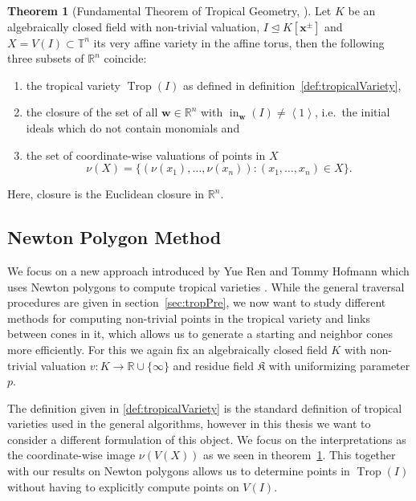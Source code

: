 \documentclass[
  paper=a4,
  titlepage,
  bibliography=totoc,
  listof=totoc,
  pagesize=pdftex
]{scrartcl}
\numberwithin{figure}{section}
\numberwithin{equation}{section}
\numberwithin{table}{section}
\newcommand*\setR{\mathds{R}}
\newcommand*\setT{\mathds{T}}
\newcommand*\ideal[1]{\left\langle #1 \right\rangle}
\let\vec\mathbf
\let\idealof\trianglelefteq
\DeclareMathOperator{\Trop}{Trop}
\DeclareMathOperator{\initial}{in}
\theoremstyle{definition}
\newtheorem{theorem}[definition]{Theorem}
\numberwithin{definition}{section}
\begin{document}
\begin{theorem}[Fundamental Theorem of Tropical Geometry,
  {\cite[Theorem~3.2.5]{sturmMacTrop}}]
  Let $K$ be an algebraically closed field with non-trivial valuation, $I \idealof K[\vec
  x^\pm]$ and $X = V(I) \subset \setT^n$ its very affine variety in the affine torus, then
  the following three subsets of $\setR^n$ coincide:
  \begin{enumerate}
    \item the tropical variety $\Trop(I)$ as defined in
      definition~\ref{def:tropicalVariety},
    \item the closure of the set of all $\vec w \in \setR^n$ with $\initial_{\vec w}(I)
      \neq \ideal1$, i.e.\ the initial ideals which do not contain monomials and
    \item the set of coordinate-wise valuations of points in $X$
      \[
        \nu(X) = \{ (\nu(x_1), \dots, \nu(x_n)) : (x_1, \dots, x_n) \in X \}.
      \]
  \end{enumerate}
  Here, closure is the Euclidean closure in $\setR^n$.
  \label{thm:fundamentalThm}
\end{theorem}


\subsection{Newton Polygon Method}

We focus on a new approach introduced by Yue Ren and Tommy Hofmann which uses Newton
polygons to compute tropical varieties \cite{tropPointsLinks}. While the general traversal
procedures are given in section~\ref{sec:tropPre}, we now want to study different methods
for computing non-trivial points in the tropical variety and links between cones in it,
which allows us to generate a starting and neighbor cones more efficiently. For this we
again fix an algebraically closed field $K$ with non-trivial valuation $v:K\to\setR \cup
\{\infty\}$ and residue field $\mathfrak K$ with uniformizing parameter $p$.

The definition given in \ref{def:tropicalVariety} is the standard definition of tropical
varieties used in the general algorithms, however in this thesis we want to consider a
different formulation of this object. We focus on the interpretations as the
coordinate-wise image $\nu(V(X))$ as we seen in theorem~\ref{thm:fundamentalThm}. This
together with our results on Newton polygons allows us to determine points in $\Trop(I)$
without having to explicitly compute points on $V(I)$.
\end{document}
